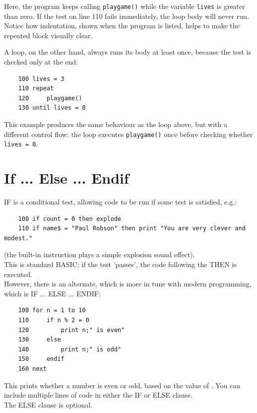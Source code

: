 Here, the program keeps calling \texttt{playgame()} while the variable \texttt{lives} is greater than zero. If the test on line 110 fails immediately, the loop body will never run. Notice how indentation, shown when the program is listed, helps to make the repeated block visually clear.

A  loop, on the other hand, always runs its body at least once, because the test is checked only at the end:

\begin{verbatim}
	100 lives = 3
	110 repeat
	120 	playgame()
	130 until lives = 0
\end{verbatim}

This example produces the same behaviour as the  loop above, but with a different control flow: the loop executes \texttt{playgame()} once before checking whether \texttt{lives = 0}.

\section{If ... Else ... Endif}

IF is a conditional test, allowing code to be run if some test is satisfied, e.g.:

\begin{verbatim}
	100 if count = 0 then explode
	110 if name$ = "Paul Robson" then print "You are very clever and modest."
\end{verbatim}

(the built-in instruction  plays a simple explosion sound effect).\\

This is standard BASIC: if the test 'passes', the code following the THEN is executed.\\

However, there is an alternate, which is more in tune with modern programming, which is IF ... ELSE ... ENDIF:

\begin{verbatim}
	100 for n = 1 to 10
	110 	if n % 2 = 0
	120    		print n;" is even"
	130 	else
	140    		print n;" is odd"
	150 	endif
	160 next
\end{verbatim}

This prints whether a number is even or odd, based on the value of . You can include multiple lines of code in either the IF or ELSE clause.\\

The ELSE clause is optional.\\

